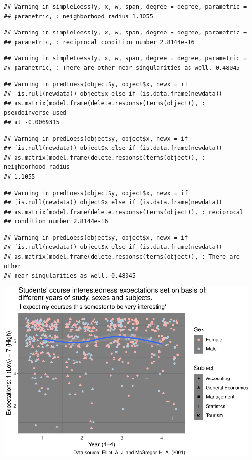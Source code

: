\documentclass[]{article}
\begin{document}
\begin{verbatim}
## Warning in simpleLoess(y, x, w, span, degree = degree, parametric =
## parametric, : neighborhood radius 1.1055
\end{verbatim}

\begin{verbatim}
## Warning in simpleLoess(y, x, w, span, degree = degree, parametric =
## parametric, : reciprocal condition number 2.8144e-16
\end{verbatim}

\begin{verbatim}
## Warning in simpleLoess(y, x, w, span, degree = degree, parametric =
## parametric, : There are other near singularities as well. 0.48045
\end{verbatim}

\begin{verbatim}
## Warning in predLoess(object$y, object$x, newx = if
## (is.null(newdata)) object$x else if (is.data.frame(newdata))
## as.matrix(model.frame(delete.response(terms(object)), : pseudoinverse used
## at -0.0069315
\end{verbatim}

\begin{verbatim}
## Warning in predLoess(object$y, object$x, newx = if
## (is.null(newdata)) object$x else if (is.data.frame(newdata))
## as.matrix(model.frame(delete.response(terms(object)), : neighborhood radius
## 1.1055
\end{verbatim}

\begin{verbatim}
## Warning in predLoess(object$y, object$x, newx = if
## (is.null(newdata)) object$x else if (is.data.frame(newdata))
## as.matrix(model.frame(delete.response(terms(object)), : reciprocal
## condition number 2.8144e-16
\end{verbatim}

\begin{verbatim}
## Warning in predLoess(object$y, object$x, newx = if
## (is.null(newdata)) object$x else if (is.data.frame(newdata))
## as.matrix(model.frame(delete.response(terms(object)), : There are other
## near singularities as well. 0.48045
\end{verbatim}

\includegraphics{StudentGoals_files/figure-latex/unnamed-chunk-17-1.pdf}
\end{document}
